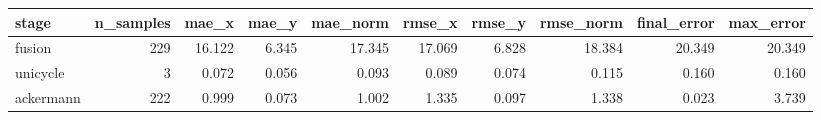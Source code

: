 \begin{tabular}{lrrrrrrrrr}
\hline
stage & n\_samples & mae\_x & mae\_y & mae\_norm & rmse\_x & rmse\_y & rmse\_norm & final\_error & max\_error \\
\hline
fusion & 229 & 16.122 & 6.345 & 17.345 & 17.069 & 6.828 & 18.384 & 20.349 & 20.349 \\
unicycle & 3 & 0.072 & 0.056 & 0.093 & 0.089 & 0.074 & 0.115 & 0.160 & 0.160 \\
ackermann & 222 & 0.999 & 0.073 & 1.002 & 1.335 & 0.097 & 1.338 & 0.023 & 3.739 \\
\hline
\end{tabular}